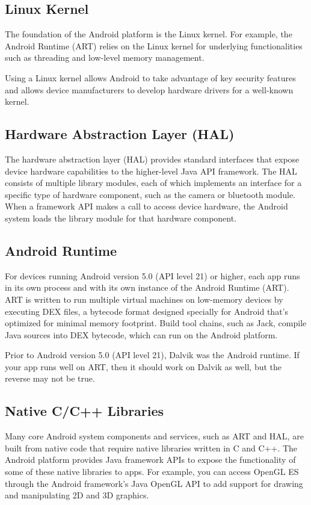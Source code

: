 \subsection{Linux Kernel}

The foundation of the Android platform is the Linux kernel. For example, the Android Runtime (ART) relies on the Linux kernel for underlying functionalities such as threading and low-level memory management.

Using a Linux kernel allows Android to take advantage of key security features and allows device manufacturers to develop hardware drivers for a well-known kernel.

\subsection{Hardware Abstraction Layer (HAL)}
The hardware abstraction layer (HAL) provides standard interfaces that expose device hardware capabilities to the higher-level Java API framework. The HAL consists of multiple library modules, each of which implements an interface for a specific type of hardware component, such as the camera or bluetooth module. When a framework API makes a call to access device hardware, the Android system loads the library module for that hardware component.

\subsection{Android Runtime}
For devices running Android version 5.0 (API level 21) or higher, each app runs in its own process and with its own instance of the Android Runtime (ART). ART is written to run multiple virtual machines on low-memory devices by executing DEX files, a bytecode format designed specially for Android that's optimized for minimal memory footprint. Build tool chains, such as Jack, compile Java sources into DEX bytecode, which can run on the Android platform.

Prior to Android version 5.0 (API level 21), Dalvik was the Android runtime. If your app runs well on ART, then it should work on Dalvik as well, but the reverse may not be true.

\subsection{Native C/C++ Libraries}

Many core Android system components and services, such as ART and HAL, are built from native code that require native libraries written in C and C++. The Android platform provides Java framework APIs to expose the functionality of some of these native libraries to apps. For example, you can access OpenGL ES through the Android framework’s Java OpenGL API to add support for drawing and manipulating 2D and 3D graphics.

